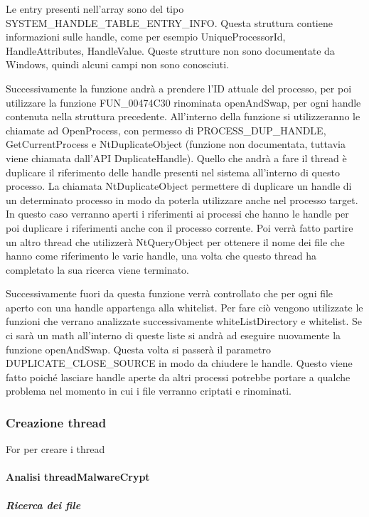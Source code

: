 \documentclass[]{article}
\begin{document}
Le entry presenti nell'array sono del tipo SYSTEM\_HANDLE\_TABLE\_ENTRY\_INFO. Questa struttura contiene informazioni sulle handle, come per esempio UniqueProcessorId, HandleAttributes, HandleValue. Queste strutture non sono documentate da Windows, quindi alcuni campi non sono conosciuti. 

Successivamente la funzione andrà a prendere l'ID attuale del processo, per poi utilizzare la funzione FUN\_00474C30 rinominata openAndSwap, per ogni handle contenuta nella struttura precedente. All'interno della funzione si utilizzeranno le chiamate ad OpenProcess, con permesso di PROCESS\_DUP\_HANDLE, GetCurrentProcess e NtDuplicateObject (funzione non documentata, tuttavia viene chiamata dall'API DuplicateHandle). Quello che andrà a fare il thread è duplicare il riferimento delle handle presenti nel sistema all'interno di questo processo. La chiamata NtDuplicateObject permettere di duplicare un handle di un determinato processo in modo da poterla utilizzare anche nel processo target. In questo caso verranno aperti i riferimenti ai processi che hanno le handle per poi duplicare i riferimenti anche con il processo corrente.  Poi verrà fatto partire un altro thread che utilizzerà NtQueryObject per ottenere il nome dei file che hanno come riferimento le varie handle, una volta che questo thread ha completato la sua ricerca viene terminato.

Successivamente fuori da questa funzione verrà controllato che per ogni file aperto con una handle appartenga alla whitelist. Per fare ciò vengono utilizzate le funzioni che verrano analizzate successivamente whiteListDirectory e whitelist. Se ci sarà un math all'interno di queste liste si andrà ad eseguire nuovamente la funzione openAndSwap. Questa volta si passerà il parametro DUPLICATE\_CLOSE\_SOURCE in modo da chiudere le handle. Questo viene fatto poiché lasciare handle aperte da altri processi potrebbe portare a qualche problema nel momento in cui i file verranno criptati e rinominati.

\subsubsection{Creazione thread }
For per creare i thread

\paragraph{Analisi threadMalwareCrypt}

\subparagraph{Ricerca dei file}
\end{document}
